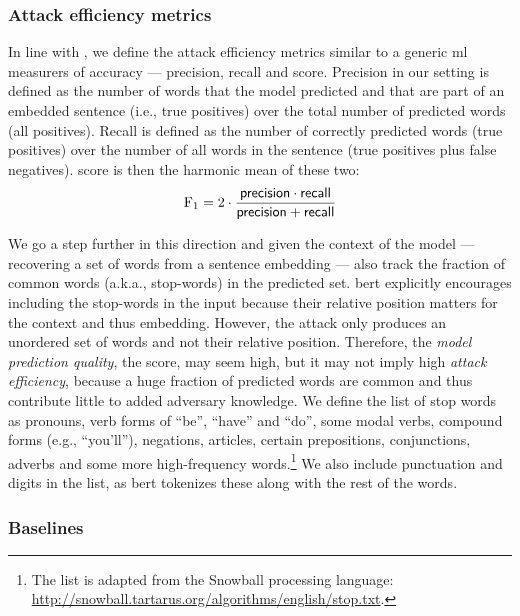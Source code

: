 			\subsubsection{Attack efficiency metrics}

				In line with \cite{embedding-attacks}, we define the attack efficiency metrics similar to a generic \acrshort{ml} measurers of accuracy --- precision, recall and \FOne{} score.
				Precision in our setting is defined as the number of words that the model predicted and that are part of an embedded sentence (i.e., true positives) over the total number of predicted words (all positives).
				Recall is defined as the number of correctly predicted words (true positives) over the number of all words in the sentence (true positives plus false negatives).
				\FOne{} score is then the harmonic mean of these two:
				\[
					\text{F}_1 = 2 \cdot \frac{ \mathsf{precision} \cdot \mathsf{recall} }{ \mathsf{precision} + \mathsf{recall} }
				\]

				We go a step further in this direction and given the context of the model --- recovering a set of words from a sentence embedding --- also track the fraction of common words (a.k.a., stop-words) in the predicted set.
				\acrshort{bert} explicitly encourages including the stop-words in the input because their relative position matters for the context and thus embedding.
				However, the attack only produces an unordered set of words and not their relative position.
				Therefore, the \emph{model prediction quality}, the \FOne{} score, may seem high, but it may not imply high \emph{attack efficiency}, because a huge fraction of predicted words are common and thus contribute little to added adversary knowledge.
				We define the list of stop words as pronouns, verb forms of ``be'', ``have'' and ``do'', some modal verbs, compound forms (e.g., ``you'll''), negations, articles, certain prepositions, conjunctions, adverbs and some more high-frequency words.\footnote{
					The list is adapted from the Snowball processing language: \url{http://snowball.tartarus.org/algorithms/english/stop.txt}.
				}
				We also include punctuation and digits in the list, as \acrshort{bert} tokenizes these along with the rest of the words.

			\subsubsection{Baselines}\label{section:knn-snapshot:attacks:experiments:baselines}

				

